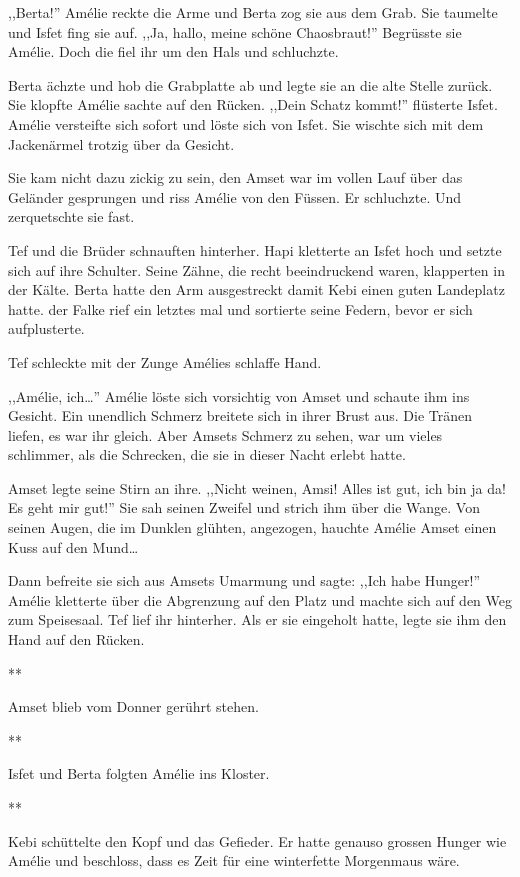 \documentclass[11pt,titlepage,a5paper]{book}
\newcommand{\sterne}{\par{\centering ***\par}}
\begin{document}
,,Berta!'' Amélie reckte die Arme und Berta zog sie aus dem Grab. Sie taumelte und Isfet fing sie auf. ,,Ja, hallo, meine schöne Chaosbraut!'' Begrüsste sie Amélie. Doch die fiel ihr um den Hals und schluchzte.

Berta ächzte und hob die Grabplatte ab und legte sie an die alte Stelle zurück. Sie klopfte Amélie sachte auf den Rücken. ,,Dein Schatz kommt!'' flüsterte Isfet. Amélie versteifte sich sofort und löste sich von Isfet. Sie wischte sich mit dem Jackenärmel trotzig über da Gesicht.

Sie kam nicht dazu zickig zu sein, den Amset war im vollen Lauf über das Geländer gesprungen und riss Amélie von den Füssen. Er schluchzte. Und zerquetschte sie fast.

Tef und die Brüder schnauften hinterher. Hapi kletterte an Isfet hoch und setzte sich auf ihre Schulter. Seine Zähne, die recht beeindruckend waren, klapperten in der Kälte. Berta hatte den Arm ausgestreckt damit Kebi einen guten Landeplatz hatte. der Falke rief ein letztes mal und sortierte seine Federn, bevor er sich aufplusterte.

Tef schleckte mit der Zunge Amélies schlaffe Hand.

,,Amélie, ich\dots '' Amélie löste sich vorsichtig von Amset und schaute ihm ins Gesicht. Ein unendlich Schmerz breitete sich in ihrer Brust aus. Die Tränen liefen, es war ihr gleich. Aber Amsets Schmerz zu sehen, war um vieles schlimmer, als die Schrecken, die sie in dieser Nacht erlebt hatte.

Amset legte seine Stirn an ihre. ,,Nicht weinen, Amsi! Alles ist gut, ich bin ja da! Es geht mir gut!'' Sie sah seinen Zweifel und strich ihm über die Wange. Von seinen Augen, die im Dunklen glühten, angezogen, hauchte Amélie Amset einen Kuss auf den Mund\dots

Dann befreite sie sich aus Amsets Umarmung und sagte: ,,Ich habe Hunger!'' Amélie kletterte über die Abgrenzung auf den Platz und machte sich auf den Weg zum Speisesaal. Tef lief ihr hinterher. Als er sie eingeholt hatte, legte sie ihm den Hand auf den Rücken.

\sterne

Amset blieb vom Donner gerührt stehen. 

\sterne

Isfet und Berta folgten Amélie ins Kloster.

\sterne

Kebi schüttelte den Kopf und das Gefieder. Er hatte genauso grossen Hunger wie Amélie und beschloss, dass es Zeit für eine winterfette Morgenmaus wäre.
\end{document}
